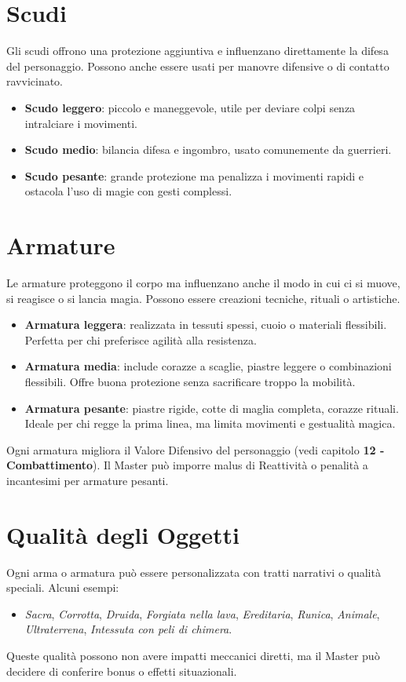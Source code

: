 \documentclass[../manuale_main.tex]{subfiles}
\begin{document}
\section{Scudi}

\noindent
Gli scudi offrono una protezione aggiuntiva e influenzano direttamente la difesa del personaggio. Possono anche essere usati per manovre difensive o di contatto ravvicinato.

\begin{itemize}
  \item \textbf{Scudo leggero}: piccolo e maneggevole, utile per deviare colpi senza intralciare i movimenti.
  \item \textbf{Scudo medio}: bilancia difesa e ingombro, usato comunemente da guerrieri.
  \item \textbf{Scudo pesante}: grande protezione ma penalizza i movimenti rapidi e ostacola l’uso di magie con gesti complessi.
\end{itemize}

\section{Armature}
Le armature proteggono il corpo ma influenzano anche il modo in cui ci si muove, si reagisce o si lancia magia. Possono essere creazioni tecniche, rituali o artistiche.

\begin{itemize}
  \item \textbf{Armatura leggera}: realizzata in tessuti spessi, cuoio o materiali flessibili. Perfetta per chi preferisce agilità alla resistenza.
  \item \textbf{Armatura media}: include corazze a scaglie, piastre leggere o combinazioni flessibili. Offre buona protezione senza sacrificare troppo la mobilità.
  \item \textbf{Armatura pesante}: piastre rigide, cotte di maglia completa, corazze rituali. Ideale per chi regge la prima linea, ma limita movimenti e gestualità magica.
\end{itemize}

Ogni armatura migliora il Valore Difensivo del personaggio (vedi capitolo  \textbf{12 - Combattimento}). Il Master può imporre malus di Reattività o penalità a incantesimi per armature pesanti.

\section{Qualità degli Oggetti}

Ogni arma o armatura può essere personalizzata con tratti narrativi o qualità speciali. Alcuni esempi:

\begin{itemize}
  \item \emph{Sacra}, \emph{Corrotta}, \emph{Druida}, \emph{Forgiata nella lava}, \emph{Ereditaria}, \emph{Runica}, \emph{Animale}, \emph{Ultraterrena}, \emph{Intessuta con peli di chimera}.
\end{itemize}

Queste qualità possono non avere impatti meccanici diretti, ma il Master può decidere di conferire bonus o effetti situazionali.
\end{document}
